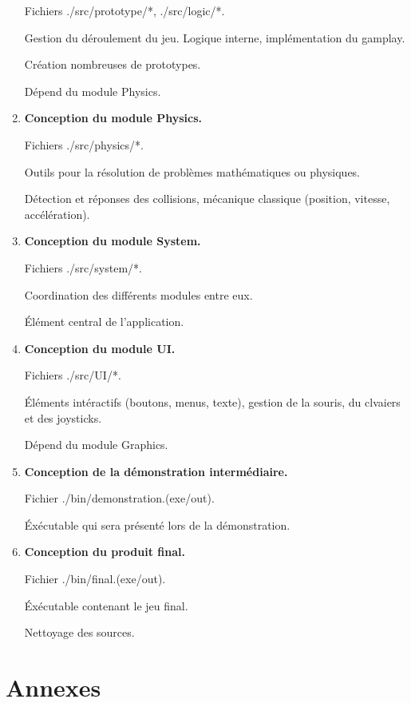 \documentclass[french]{report}
\begin{document}
\begin{enumerate}
    Fichiers ./src/prototype/*, ./src/logic/*.

    Gestion du déroulement du jeu.
    Logique interne, implémentation du gamplay.

    Création nombreuses de prototypes.

    Dépend du module Physics.

    \item \textbf{Conception du module Physics.}
    
    Fichiers ./src/physics/*.

    Outils pour la résolution
    de problèmes mathématiques ou physiques.

    Détection et réponses des collisions,
    mécanique classique (position, vitesse, accélération).
    
    \item \textbf{Conception du module System.}
    
    Fichiers ./src/system/*.

    Coordination des différents modules entre eux.

    Élément central de l'application.
    
    \item \textbf{Conception du module UI.}
    
    Fichiers ./src/UI/*.

    Éléments intéractifs (boutons, menus, texte),
    gestion de la souris, du clvaiers et des joysticks.

    Dépend du module Graphics.
    
    \item \textbf{Conception de la démonstration intermédiaire.}
    
    Fichier ./bin/demonstration.(exe/out).

    Éxécutable qui sera présenté lors de la démonstration.
    
    \item \textbf{Conception du produit final.}
    
    Fichier ./bin/final.(exe/out).

    Éxécutable contenant le jeu final.

    Nettoyage des sources.


\end{enumerate}

\chapter{Annexes}
\end{document}

